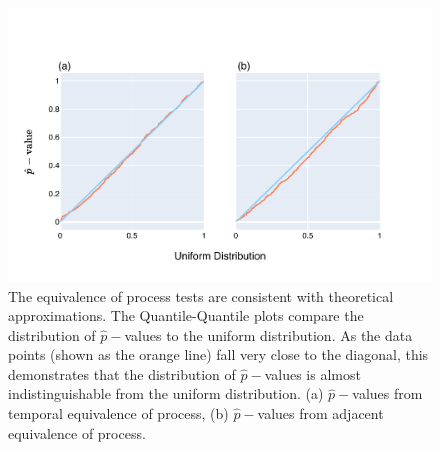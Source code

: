 \begin{figure}[!htb]
\centering
\includegraphics[width=\textwidth]{figures/plots/synthetic/adj-temp_eop/High JSD, High Entropy.pdf}
\caption{The equivalence of process tests are consistent with theoretical approximations. The Quantile-Quantile plots compare the distribution of $\hat p-$values to the uniform distribution. As the data points (shown as the orange line) fall very close to the diagonal, this demonstrates that the distribution of $\hat p-$values is almost indistinguishable from the uniform distribution. (a) $\hat p-$values from temporal equivalence of process, (b) $\hat p-$values from adjacent equivalence of process. }
\label{fig:synthetic/adj-temp_eop/HighJSDHighEntropy}
\end{figure}